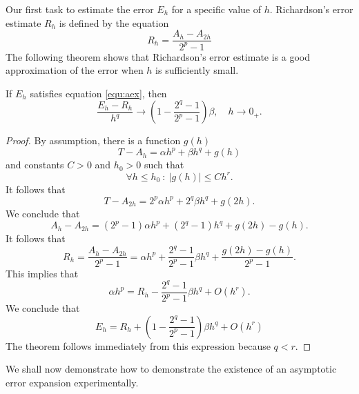 \documentclass[runningheads]{llncs}
\begin{document}
Our first task to estimate the error $E_h$ for a specific value of $h$. Richardson's error estimate $R_h$ is defined by the equation
\begin{equation}
 R_h =  \frac{A_h - A_{2h}}{2^p - 1}
\end{equation}
The following theorem shows that Richardson's error estimate is a good approximation of the error when $h$ is sufficiently small.

\begin{theorem} If $E_h$ satisfies equation \eqref{equ:aex}, then
  \begin{equation}
    \frac{E_h - R_h}{h^q} \rightarrow  \left(1 - \frac{2^q-1}{2^p-1} \right) \beta, \quad h \rightarrow 0_+.
  \end{equation}
\end{theorem}
\begin{proof}
  By assumption, there is a function $g(h)$ 
  \begin{equation}
    T - A_h  = \alpha h^p + \beta h^q + g(h)
  \end{equation}
  and constants $C>0$ and $h_0 > 0$ such that
  \begin{equation}
    \forall h \leq h_0 \: : \: |g(h)| \leq Ch^r.
  \end{equation}
  It follows that
  \begin{equation}
    T- A_{2h} = 2^p \alpha h^p + 2^q \beta h^q + g(2h).
  \end{equation}
  We conclude that
  \begin{equation} \label{equ:Dh:1}
    A_h - A_{2h} = (2^p - 1) \alpha h^p + (2^q - 1) h^q + g(2h) - g(h).
  \end{equation}
  It follows that
  \begin{equation}
    R_h = \frac{A_h - A_{2h}}{2^p - 1} = \alpha h^p + \frac{2^q-1}{2^p-1} \beta h^q + \frac{g(2h)-g(h)}{2^p-1}.
  \end{equation}
 This implies that
  \begin{equation}
    \alpha h^p =  R_h - \frac{2^q-1}{2^p-1} \beta h^q + O(h^r).
  \end{equation}
  We conclude that
  \begin{equation}
    E_h = R_h + \left(1 - \frac{2^q-1}{2^p-1} \right) \beta h^q + O(h^r)
  \end{equation}
  The theorem follows immediately from this expression because $q < r$.
\end{proof}
We shall now demonstrate how to demonstrate the existence of an asymptotic error expansion experimentally.
\end{document}
